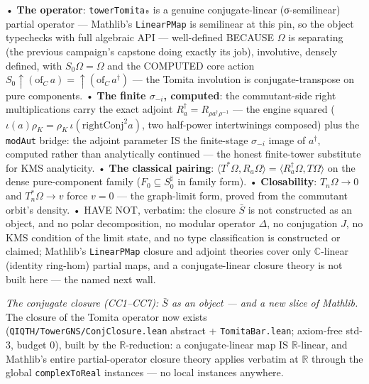\documentclass[11pt,a4paper]{article}
\begin{document}
  • \textbf{The operator}: \texttt{towerTomita₀} is a genuine conjugate-linear (σ-semilinear) partial operator — Mathlib's \texttt{LinearPMap} is semilinear at this pin, so the object typechecks with full algebraic API — well-defined BECAUSE $\Omega$ is separating (the previous campaign's capstone doing exactly its job), involutive, densely defined, with $S_0\Omega = \Omega$ and the COMPUTED core action $S_0\!\uparrow\!(\mathrm{of}_C\,a) = \uparrow\!(\mathrm{of}_C\,a^\dagger)$ — the Tomita involution is conjugate-transpose on pure components.
  • \textbf{The finite $\sigma_{-i}$, computed}: the commutant-side right multiplications carry the exact adjoint $R_a^\dagger = R_{\rho a^\dagger \rho^{-1}}$ — the engine squared ($\iota(a)\rho_K = \rho_K\,\iota(\mathrm{rightConj}^2 a)$, two half-power intertwinings composed) plus the \texttt{modAut} bridge: the adjoint parameter IS the finite-stage $\sigma_{-i}$ image of $a^\dagger$, computed rather than analytically continued — the honest finite-tower substitute for KMS analyticity.
  • \textbf{The classical pairing}: $\langle T^*\Omega, R_a\Omega\rangle = \langle R_a^\dagger\Omega, T\Omega\rangle$ on the dense pure-component family ($F_0 \subseteq S_0^\sharp$ in family form).
  • \textbf{Closability}: $T_n\Omega \to 0$ and $T_n^*\Omega \to v$ force $v = 0$ — the graph-limit form, proved from the commutant orbit's density.
  • HAVE NOT, verbatim: the closure $\bar S$ is not constructed as an object, and no polar decomposition, no modular operator $\Delta$, no conjugation $J$, no KMS condition of the limit state, and no type classification is constructed or claimed; Mathlib's \texttt{LinearPMap} closure and adjoint theories cover only $\mathbb{C}$-linear (identity ring-hom) partial maps, and a conjugate-linear closure theory is not built here — the named next wall.

\emph{The conjugate closure (CC1--CC7): $\bar S$ as an object — and a new slice of Mathlib.} The closure of the Tomita operator now exists (\texttt{QIQTH/TowerGNS/ConjClosure.lean} abstract + \texttt{TomitaBar.lean}; axiom-free std-3, budget 0), built by the $\mathbb{R}$-reduction: a conjugate-linear map IS $\mathbb{R}$-linear, and Mathlib's entire partial-operator closure theory applies verbatim at $\mathbb{R}$ through the global \texttt{complexToReal} instances — no local instances anywhere.
\end{document}

